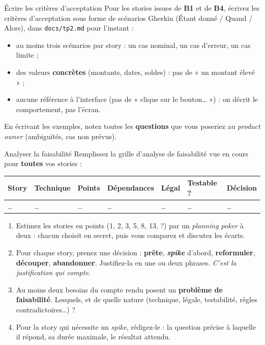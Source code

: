 \documentclass[11pt]{article}
\begin{document}
\begin{exobox}{Écrire les critères d'acceptation}
Pour les stories issues de \textbf{B1} et de \textbf{B4}, écrivez les critères d'acceptation sous forme de scénarios Gherkin (Étant donné / Quand / Alors), dans \texttt{docs/tp2.md} pour l'instant :
\begin{itemize}[leftmargin=1.2em]
  \item au moins trois scénarios par story : un cas nominal, un cas d'erreur, un cas limite ;
  \item des valeurs \textbf{concrètes} (montants, dates, soldes) : pas de « un montant élevé » ;
  \item aucune référence à l'interface (pas de « clique sur le bouton\ldots{} ») : on décrit le comportement, pas l'écran.
\end{itemize}
En écrivant les exemples, notez toutes les \textbf{questions} que vous poseriez au \textit{product owner} (ambiguïtés, cas non prévus).
\end{exobox}

\begin{exobox}{Analyser la faisabilité}
Remplissez la grille d'analyse de faisabilité vue en cours pour \textbf{toutes} vos stories :

\medskip
{\small
\begin{tabular}{@{}lllllll@{}}
\toprule
\textbf{Story} & \textbf{Technique} & \textbf{Points} & \textbf{Dépendances} & \textbf{Légal} & \textbf{Testable ?} & \textbf{Décision} \\
\midrule
\ldots & \ldots & \ldots & \ldots & \ldots & \ldots & \ldots \\
\bottomrule
\end{tabular}}
\medskip

\begin{enumerate}[leftmargin=1.4em]
  \item Estimez les stories en points (1, 2, 3, 5, 8, 13, ?) par un \textit{planning poker} à deux : chacun choisit en secret, puis vous comparez et discutez les écarts.
  \item Pour chaque story, prenez une décision : \textbf{prête}, \textbf{\textit{spike}} d'abord, \textbf{reformuler}, \textbf{découper}, \textbf{abandonner}. Justifiez-la en une ou deux phrases. \textit{C'est la justification qui compte.}
  \item Au moins deux besoins du compte rendu posent un \textbf{problème de faisabilité}. Lesquels, et de quelle nature (technique, légale, testabilité, règles contradictoires\ldots) ?
  \item Pour la story qui nécessite un \textit{spike}, rédigez-le : la question précise à laquelle il répond, sa durée maximale, le résultat attendu.
\end{enumerate}
\end{exobox}
\end{document}
